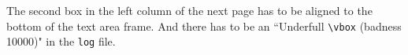 \documentclass[twocolumn]{scrreprt}
\begin{document}
The second box in the left column of the next page has to be aligned to the
bottom of the text area frame. And there has to be an ``Underfull \verb|\vbox|
(badness 10000)" in the \texttt{log} file.

\clearpage

\noindent{}

\noindent{}

\noindent{}
\clearpage
{}
\end{document}
